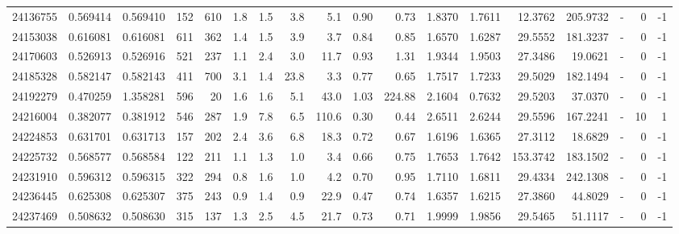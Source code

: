 \begin{tabular}{rrrrrrrrrrrrrrrlrr}
  24136755 & 0.569414 &   0.569410 &  152 &  610 &      1.8 &      1.5 &     3.8 &      5.1 &       0.90 &        0.73 &  1.8370 &  1.7611 &   12.3762 &  205.9732 &             - &        0 &         -1 \\
  24153038 & 0.616081 &   0.616081 &  611 &  362 &      1.4 &      1.5 &     3.9 &      3.7 &       0.84 &        0.85 &  1.6570 &  1.6287 &   29.5552 &  181.3237 &             - &        0 &         -1 \\
  24170603 & 0.526913 &   0.526916 &  521 &  237 &      1.1 &      2.4 &     3.0 &     11.7 &       0.93 &        1.31 &  1.9344 &  1.9503 &   27.3486 &   19.0621 &             - &        0 &         -1 \\
  24185328 & 0.582147 &   0.582143 &  411 &  700 &      3.1 &      1.4 &    23.8 &      3.3 &       0.77 &        0.65 &  1.7517 &  1.7233 &   29.5029 &  182.1494 &             - &        0 &         -1 \\
  24192279 & 0.470259 &   1.358281 &  596 &   20 &      1.6 &      1.6 &     5.1 &     43.0 &       1.03 &      224.88 &  2.1604 &  0.7632 &   29.5203 &   37.0370 &             - &        0 &         -1 \\
  24216004 & 0.382077 &   0.381912 &  546 &  287 &      1.9 &      7.8 &     6.5 &    110.6 &       0.30 &        0.44 &  2.6511 &  2.6244 &   29.5596 &  167.2241 &             - &       10 &          1 \\
  24224853 & 0.631701 &   0.631713 &  157 &  202 &      2.4 &      3.6 &     6.8 &     18.3 &       0.72 &        0.67 &  1.6196 &  1.6365 &   27.3112 &   18.6829 &             - &        0 &         -1 \\
  24225732 & 0.568577 &   0.568584 &  122 &  211 &      1.1 &      1.3 &     1.0 &      3.4 &       0.66 &        0.75 &  1.7653 &  1.7642 &  153.3742 &  183.1502 &             - &        0 &         -1 \\
  24231910 & 0.596312 &   0.596315 &  322 &  294 &      0.8 &      1.6 &     1.0 &      4.2 &       0.70 &        0.95 &  1.7110 &  1.6811 &   29.4334 &  242.1308 &             - &        0 &         -1 \\
  24236445 & 0.625308 &   0.625307 &  375 &  243 &      0.9 &      1.4 &     0.9 &     22.9 &       0.47 &        0.74 &  1.6357 &  1.6215 &   27.3860 &   44.8029 &             - &        0 &         -1 \\
  24237469 & 0.508632 &   0.508630 &  315 &  137 &      1.3 &      2.5 &     4.5 &     21.7 &       0.73 &        0.71 &  1.9999 &  1.9856 &   29.5465 &   51.1117 &             - &        0 &         -1 \\

\end{tabular}
